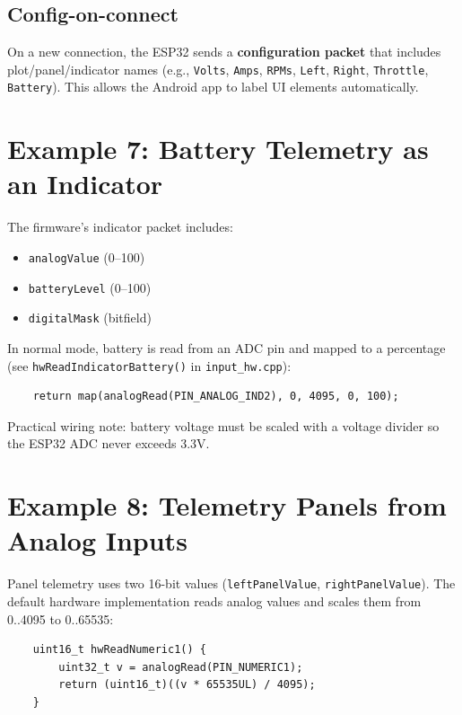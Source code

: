 \subsection{Config-on-connect}
On a new connection, the ESP32 sends a \textbf{configuration packet} that includes plot/panel/indicator
names (e.g., \texttt{Volts}, \texttt{Amps}, \texttt{RPMs}, \texttt{Left}, \texttt{Right}, \texttt{Throttle}, \texttt{Battery}).
This allows the Android app to label UI elements automatically.

\section{Example 7: Battery Telemetry as an Indicator}
\label{sec:example-battery}

The firmware’s indicator packet includes:
\begin{itemize}
    \item \texttt{analogValue} (0--100)
    \item \texttt{batteryLevel} (0--100)
    \item \texttt{digitalMask} (bitfield)
\end{itemize}

In normal mode, battery is read from an ADC pin and mapped to a percentage (see \texttt{hwReadIndicatorBattery()}
in \texttt{input\_hw.cpp}):

\begin{verbatim}
    return map(analogRead(PIN_ANALOG_IND2), 0, 4095, 0, 100);
\end{verbatim}

\noindent Practical wiring note: battery voltage must be scaled with a voltage divider so the ESP32 ADC
never exceeds 3.3V.

\section{Example 8: Telemetry Panels from Analog Inputs}
\label{sec:example-panels}

Panel telemetry uses two 16-bit values (\texttt{leftPanelValue}, \texttt{rightPanelValue}). The default
hardware implementation reads analog values and scales them from 0..4095 to 0..65535:

\begin{verbatim}
    uint16_t hwReadNumeric1() {
        uint32_t v = analogRead(PIN_NUMERIC1);
        return (uint16_t)((v * 65535UL) / 4095);
    }
\end{verbatim}

